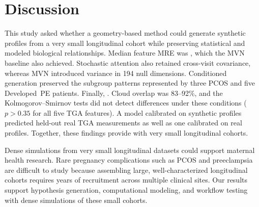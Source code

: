 \section{Discussion}
\label{sec:discussion}

This study asked whether a geometry-based method could generate synthetic profiles from a
very small longitudinal cohort while preserving statistical and modeled biological
relationships. Median feature MRE was , which the MVN baseline also achieved.
Stochastic attention also retained cross-visit covariance, whereas MVN introduced variance in
194 null dimensions. Conditioned generation preserved the subgroup patterns represented by
three PCOS and five Developed~PE patients. Finally, . Cloud overlap was 83--92\%, and
the Kolmogorov--Smirnov tests did not detect differences under these conditions ($p>0.35$ for
all five TGA features). A model calibrated on synthetic profiles predicted held-out real TGA
measurements as well as one calibrated on real profiles.  Together, these findings provide  with very small longitudinal cohorts.

Dense simulations from very small longitudinal datasets could support maternal health
research. Rare pregnancy complications such as PCOS and preeclampsia are difficult to study
because assembling large, well-characterized longitudinal cohorts requires years of
recruitment across multiple clinical sites. Our results support hypothesis generation,
computational modeling, and workflow testing with dense simulations of these small cohorts.

